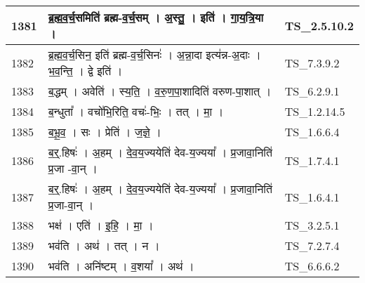 \documentclass[17pt]{extarticle}
\begin{document}
\begin{longtable}{||p{0.4in}||p{4.9in}||p{0.9in}||}
    \hline
        
    1381 & ब्र॒ह्म॒व॒र्च॒समिति॑ ब्रह्म{-}व॒र्च॒सम्   ।   अ॒स्तु॒   ।   इति॑   ।   गा॒य॒त्रि॒या   ।    & TS\_2.5.10.2       \\
    
    \hline
        
    1382 & ब्र॒ह्म॒व॒र्च॒सिन॒ इति॑ ब्रह्म{-}व॒र्च॒सिनः॑   ।   अ॒न्ना॒दा इत्य॑न्न{-}अ॒दाः   ।   भ॒व॒न्ति॒   ।   द्वे इति॑   ।    & TS\_7.3.9.2       \\
    
    \hline
        
    1383 & ब॒द्धम्   ।   अवेति॑   ।   स्य॒ति॒   ।   व॒रु॒ण॒पा॒शादिति॑ वरुण{-}पा॒शात्   ।    & TS\_6.2.9.1       \\
    
    \hline
        
    1384 & ब॒न्धुता᳚   ।   वचो॑भि॒रिति॒ वचः॑{-}भिः॒   ।   तत्   ।   मा॒   ।    & TS\_1.2.14.5       \\
    
    \hline
        
    1385 & ब॒भू॒व॒   ।   सः   ।   प्रेति॑   ।   ज॒ज्ञे॒   ।    & TS\_1.6.6.4       \\
    
    \hline
        
    1386 & ब॒र्॒.हिषः॑   ।   अ॒हम्   ।   दे॒व॒य॒ज्ययेति॑ देव{-}य॒ज्यया᳚   ।   प्र॒जावा॒निति॑ प्र॒जा {-}वा॒न्   ।    & TS\_1.7.4.1       \\
    
    \hline
        
    1387 & ब॒र्॒.हिषः॑   ।   अ॒हम्   ।   दे॒व॒य॒ज्ययेति॑ देव{-}य॒ज्यया᳚   ।   प्र॒जावा॒निति॑ प्र॒जा{-}वा॒न्   ।    & TS\_1.6.4.1       \\
    
    \hline
        
    1388 & भक्ष॑   ।   एति॑   ।   इ॒हि॒   ।   मा॒   ।    & TS\_3.2.5.1       \\
    
    \hline
        
    1389 & भव॑ति   ।   अथ॑   ।   तत्   ।   न   ।    & TS\_7.2.7.4       \\
    
    \hline
        
    1390 & भव॑ति   ।   अनि॑ष्टम्   ।   व॒शया᳚   ।   अथ॑   ।    & TS\_6.6.6.2       \\
    
    \hline
        

\end{longtable}
\end{document}
